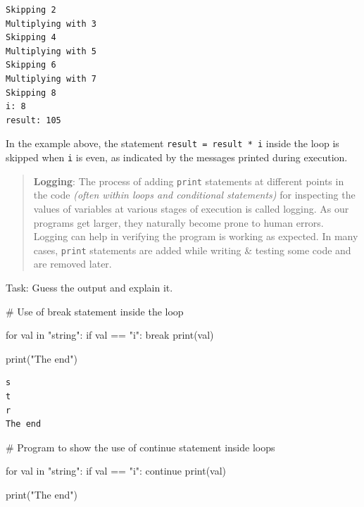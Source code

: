 \documentclass[
  letterpaper,
  DIV=11,
  numbers=noendperiod]{scrreprt}
\newenvironment{Shaded}{\begin{snugshade}}{\end{snugshade}}
\newcommand{\BuiltInTok}[1]{\textcolor[rgb]{0.00,0.23,0.31}{#1}}
\newcommand{\CommentTok}[1]{\textcolor[rgb]{0.37,0.37,0.37}{#1}}
\newcommand{\ControlFlowTok}[1]{\textcolor[rgb]{0.00,0.23,0.31}{#1}}
\newcommand{\KeywordTok}[1]{\textcolor[rgb]{0.00,0.23,0.31}{#1}}
\newcommand{\NormalTok}[1]{\textcolor[rgb]{0.00,0.23,0.31}{#1}}
\newcommand{\OperatorTok}[1]{\textcolor[rgb]{0.37,0.37,0.37}{#1}}
\newcommand{\StringTok}[1]{\textcolor[rgb]{0.13,0.47,0.30}{#1}}
\begin{document}
\begin{verbatim}
Skipping 2
Multiplying with 3
Skipping 4
Multiplying with 5
Skipping 6
Multiplying with 7
Skipping 8
i: 8
result: 105
\end{verbatim}

In the example above, the statement \texttt{result\ =\ result\ *\ i}
inside the loop is skipped when \texttt{i} is even, as indicated by the
messages printed during execution.

\begin{quote}
\textbf{Logging}: The process of adding \texttt{print} statements at
different points in the code \emph{(often within loops and conditional
statements)} for inspecting the values of variables at various stages of
execution is called logging. As our programs get larger, they naturally
become prone to human errors. Logging can help in verifying the program
is working as expected. In many cases, \texttt{print} statements are
added while writing \& testing some code and are removed later.
\end{quote}

Task: Guess the output and explain it.

\begin{Shaded}
\begin{Highlighting}[]
\CommentTok{\# Use of break statement inside the loop}

\ControlFlowTok{for}\NormalTok{ val }\KeywordTok{in} \StringTok{"string"}\NormalTok{:}
    \ControlFlowTok{if}\NormalTok{ val }\OperatorTok{==} \StringTok{"i"}\NormalTok{:}
        \ControlFlowTok{break}
    \BuiltInTok{print}\NormalTok{(val)}

\BuiltInTok{print}\NormalTok{(}\StringTok{"The end"}\NormalTok{)}
\end{Highlighting}
\end{Shaded}

\begin{verbatim}
s
t
r
The end
\end{verbatim}

\begin{Shaded}
\begin{Highlighting}[]
\CommentTok{\# Program to show the use of continue statement inside loops}

\ControlFlowTok{for}\NormalTok{ val }\KeywordTok{in} \StringTok{"string"}\NormalTok{:}
    \ControlFlowTok{if}\NormalTok{ val }\OperatorTok{==} \StringTok{"i"}\NormalTok{:}
        \ControlFlowTok{continue}
    \BuiltInTok{print}\NormalTok{(val)}

\BuiltInTok{print}\NormalTok{(}\StringTok{"The end"}\NormalTok{)}
\end{Highlighting}
\end{Shaded}
\end{document}
